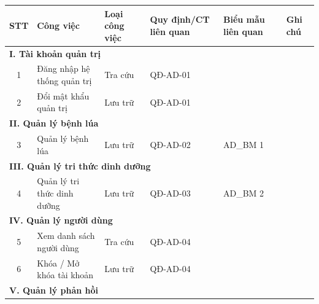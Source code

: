 \documentclass[12pt,a4paper]{article}
\begin{document}
\begin{longtable}{|c|l|l|l|l|p{3.5cm}|}
    \hline
    \rowcolor{headerblue}
    \textbf{STT} & \textbf{Công việc}          & \textbf{Loại công việc} & \textbf{Quy định/CT liên quan} & \textbf{Biểu mẫu liên quan} & \textbf{Ghi chú} \\
    \hline
    \endhead
    \multicolumn{6}{|l|}{\cellcolor{notegreen}\textbf{I. Tài khoản quản trị}}                                                                              \\
    \hline
    1            & Đăng nhập hệ thống quản trị & Tra cứu                 & QĐ-AD-01                       &                             &                  \\
    \hline
    2            & Đổi mật khẩu quản trị       & Lưu trữ                 & QĐ-AD-01                       &                             &                  \\
    \hline
    \multicolumn{6}{|l|}{\cellcolor{notegreen}\textbf{II. Quản lý bệnh lúa}}                                                                               \\
    \hline
    3            & Quản lý bệnh lúa            & Lưu trữ                 & QĐ-AD-02                       & AD\_BM 1                    &                  \\
    \hline
    \multicolumn{6}{|l|}{\cellcolor{notegreen}\textbf{III. Quản lý tri thức dinh dưỡng}}                                                                   \\
    \hline
    4            & Quản lý tri thức dinh dưỡng & Lưu trữ                 & QĐ-AD-03                       & AD\_BM 2                    &                  \\
    \hline
    \multicolumn{6}{|l|}{\cellcolor{notegreen}\textbf{IV. Quản lý người dùng}}                                                                             \\
    \hline
    5            & Xem danh sách người dùng    & Tra cứu                 & QĐ-AD-04                       &                             &                  \\
    \hline
    6            & Khóa / Mở khóa tài khoản    & Lưu trữ                 & QĐ-AD-04                       &                             &                  \\
    \hline
    \multicolumn{6}{|l|}{\cellcolor{notegreen}\textbf{V. Quản lý phản hồi}}                                                                                \\

\end{longtable}
\end{document}
